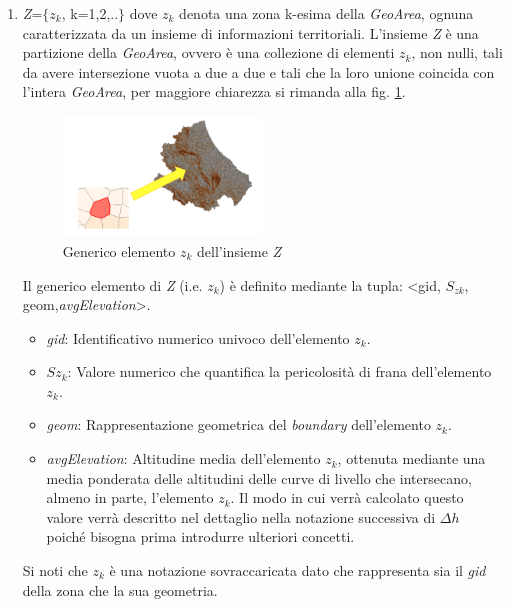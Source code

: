 \begin{enumerate}
\item\textit{Z}=$\{${$z_k$}, k=1,2,..$\}$ dove $z_k$ denota una zona k-esima della \textit{GeoArea}, ognuna caratterizzata da un insieme di informazioni territoriali. L'insieme \textit{Z} è una partizione della \textit{GeoArea}, ovvero è una collezione di elementi $z_k$, non nulli, tali da avere intersezione vuota a due a due e tali che la loro unione coincida con l'intera \textit{GeoArea}, per maggiore chiarezza si rimanda alla fig. \ref{fig:geoarea}.  
\begin{figure}[h]
\centering
\includegraphics[width=0.5\textwidth]{img/zeta}
\caption{Generico elemento $z_k$ dell'insieme \textit{Z}}
	\label{fig:geoarea}
\end{figure}
\newpage
Il generico elemento di \textit{Z} (i.e. $z_k$) è definito mediante la tupla: <gid, $S_{zk}$, geom,\textit{avgElevation}>.
\begin{itemize}
\item \textit{gid}: Identificativo numerico univoco dell'elemento $z_k$.
\item \textit{$Sz_k$}: Valore numerico che quantifica la pericolosità di frana dell'elemento $z_k$. 
\item \textit{geom}: Rappresentazione geometrica del \textit{boundary} dell'elemento $z_k$.

\item \textit{avgElevation}: Altitudine media dell'elemento $z_k$, ottenuta mediante una media ponderata delle altitudini delle curve di livello che intersecano, almeno in parte, l'elemento $z_k$. Il modo in cui verrà calcolato questo valore verrà descritto nel dettaglio nella notazione successiva di $\Delta{h}$ poiché bisogna prima introdurre ulteriori concetti.
\end{itemize}
Si noti che $z_k$ è una notazione sovraccaricata dato che rappresenta sia il \textit{gid} della zona che la sua geometria.


\end{enumerate}
